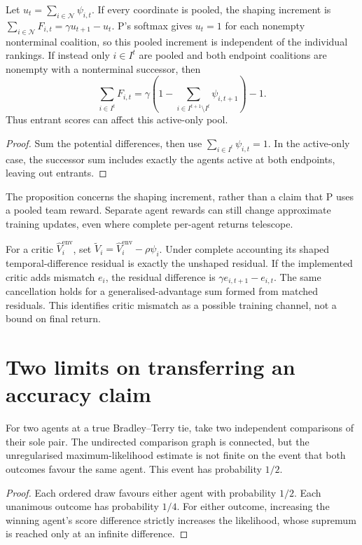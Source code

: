 \documentclass{article}
\begin{document}
\begin{proposition}
Let \(u_t=\sum_{i\in\mathcal N}\psi_{i,t}\). If every coordinate is pooled, the shaping increment is
\(\sum_{i\in\mathcal N}F_{i,t}=\gamma u_{t+1}-u_t\). P's softmax gives \(u_t=1\) for each nonempty
nonterminal coalition, so this pooled increment is independent of the individual rankings. If instead only
\(i\in I^t\) are pooled and both endpoint coalitions are nonempty with a nonterminal successor, then
\[
\sum_{i\in I^t}F_{i,t}
=\gamma\left(1-\sum_{i\in I^{t+1}\setminus I^t}\psi_{i,t+1}\right)-1.
\]
Thus entrant scores can affect this active-only pool.
\end{proposition}
\begin{proof}
Sum the potential differences, then use \(\sum_{i\in I^t}\psi_{i,t}=1\). In the active-only case, the
successor sum includes exactly the agents active at both endpoints, leaving out entrants. %
\end{proof}

The proposition concerns the shaping increment, rather than a claim that P uses a pooled team reward.
Separate agent rewards can still change approximate training updates, even where complete per-agent returns
telescope. %

For a critic \(\widehat V_i^{\mathrm{env}}\), set \(\widetilde V_i=\widehat V_i^{\mathrm{env}}-\rho\psi_i\).
Under complete accounting its shaped temporal-difference residual is exactly the unshaped residual. If the
implemented critic adds mismatch \(e_i\), the residual difference is \(\gamma e_{i,t+1}-e_{i,t}\). The same
cancellation holds for a generalised-advantage sum formed from matched residuals. This identifies critic
mismatch as a possible training channel, not a bound on final return. %

\section{Two limits on transferring an accuracy claim}

\begin{proposition}
For two agents at a true Bradley--Terry tie, take two independent comparisons of their sole pair. The
undirected comparison graph is connected, but the unregularised maximum-likelihood estimate is not finite on
the event that both outcomes favour the same agent. This event has probability \(1/2\).
\end{proposition}
\begin{proof}
Each ordered draw favours either agent with probability \(1/2\). Each unanimous outcome has probability
\(1/4\). For either outcome, increasing the winning agent's score difference strictly increases the
likelihood, whose supremum is reached only at an infinite difference. %
\end{proof}
\end{document}
